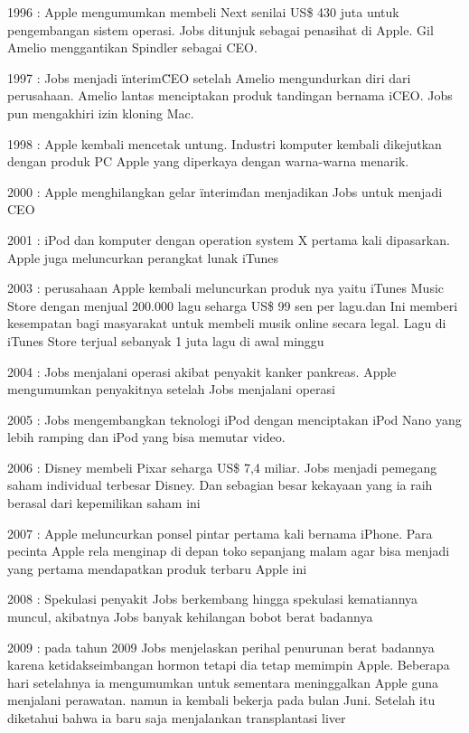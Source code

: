 1996 : Apple mengumumkan membeli Next senilai US\$ 430 juta untuk pengembangan sistem operasi. Jobs ditunjuk sebagai penasihat di Apple. Gil Amelio menggantikan Spindler sebagai CEO. 

1997 : Jobs menjadi \"interim\" CEO setelah Amelio mengundurkan diri dari perusahaan. Amelio lantas menciptakan produk tandingan bernama iCEO. Jobs pun mengakhiri izin kloning Mac. 

1998 : Apple kembali mencetak untung. Industri komputer kembali dikejutkan dengan produk PC Apple yang diperkaya dengan warna-warna menarik. 

2000 : Apple menghilangkan gelar \"interim\" dan menjadikan Jobs untuk menjadi CEO

2001 : iPod dan komputer dengan operation system X pertama kali dipasarkan. Apple juga meluncurkan perangkat lunak iTunes 

2003 : perusahaan Apple kembali meluncurkan produk nya yaitu iTunes Music Store dengan menjual 200.000 lagu seharga US\$ 99 sen per lagu.dan Ini memberi kesempatan bagi masyarakat untuk membeli musik online secara legal. Lagu di iTunes Store terjual sebanyak 1 juta lagu di awal minggu

2004 : Jobs menjalani operasi akibat penyakit kanker pankreas. Apple mengumumkan penyakitnya setelah Jobs menjalani operasi

2005 : Jobs mengembangkan teknologi iPod dengan menciptakan iPod Nano yang lebih ramping dan iPod yang bisa memutar video. 

2006 : Disney membeli Pixar seharga US\$ 7,4 miliar. Jobs menjadi pemegang saham individual terbesar Disney. Dan sebagian besar kekayaan yang ia raih berasal dari kepemilikan saham ini

2007 : Apple meluncurkan ponsel pintar pertama kali bernama iPhone. Para pecinta Apple rela menginap di depan toko sepanjang malam agar bisa menjadi yang pertama mendapatkan produk terbaru Apple ini 

2008 : Spekulasi penyakit Jobs berkembang hingga spekulasi kematiannya muncul, akibatnya Jobs banyak kehilangan bobot berat badannya

2009 : pada tahun 2009 Jobs menjelaskan perihal penurunan berat badannya karena ketidakseimbangan hormon tetapi dia tetap memimpin Apple. Beberapa hari setelahnya ia mengumumkan untuk sementara meninggalkan Apple guna menjalani perawatan. namun ia kembali bekerja pada bulan Juni. Setelah itu diketahui bahwa ia baru saja menjalankan transplantasi liver

